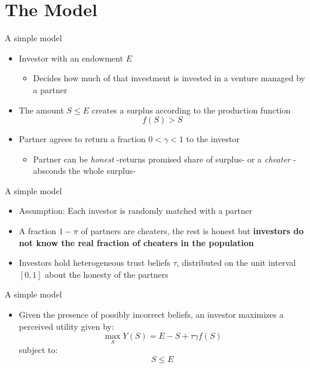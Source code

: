 \documentclass[pdftex,12pt,xcolor=pdftex,table]{beamer}
\begin{document}
\section{The Model}
\begin{frame}{A simple model}
    \begin{itemize}
        \item Investor with an endowment $E$
            \begin{itemize}
                \item Decides how much of that investment is invested  in a venture managed by a partner
            \end{itemize}        \pause
        \item The amount $S \leq E$ creates a surplus according to the production function $$f(S)>S$$ \pause
        \item Partner agrees to return a fraction $0< \gamma<1$ to the investor
        \begin{itemize}
            \item Partner can be \textit{honest} -returns promised share of surplus- or a \textit{cheater} -absconds the whole surplus-
        \end{itemize}
    \end{itemize}
\end{frame}
\begin{frame}{A simple model}
    \begin{itemize}
        \item Assumption: Each investor is randomly matched with a partner
        \item A fraction $1-\pi$ of partners are cheaters, the rest is honest but \textbf{investors do not know the real fraction of cheaters in the population}
        \item Investors hold heterogeneous trust beliefs $\tau$, distributed on the unit interval $[0,1]$ about the honesty of the partners
    \end{itemize}
\end{frame}

\begin{frame}{A simple model}
    \begin{itemize}
        \item Given the presence of possibly incorrect beliefs, an investor maximizes a perceived utility given by:
    \begin{equation*}
        \max_{S} Y(S)=E-S +\tau \gamma f(S)
    \end{equation*}
    subject to:
    \begin{equation*}
        S \leq E
    \end{equation*}
    \end{itemize}
\end{frame}
\end{document}
